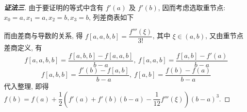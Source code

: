 \begin{proof}[{\songti \textbf{证法三}}]
    由于要证明的等式中含有 $f'(a)$ 及 $f'(b)$, 因而考虑选取重节点: $x_{0}=a,x_{1}=a,x_{2}=b,x_{3}=b$, 列差商表如下
    \begin{table}[H]
        \centering
    \end{table}
    而由差商与导数的关系, 得 $f[a,a,b,b]=\dfrac{f'''(\xi)}{3!}$, 其中 $\xi\in(a,b)$, 又由重节点差商定义, 有
    \begin{equation*}
        f[a,a,b,b]=\dfrac{f[a,b,b]-f[a,a,b]}{b-a},~f[a,a,b]=\dfrac{f[a,b]-f'(a)}{b-a}
    \end{equation*}
    \begin{equation*}
        f[a,b,b]=\dfrac{f'(b)-f[a,b]}{b-a},~f[a,b]=\dfrac{f(b)-f(a)}{b-a}
    \end{equation*}
    代入整理, 即得 $f(b)=f(a)+\dfrac{1}{2}(f'(a)+f'(b)(b-a)-\dfrac{1}{12}f'''(\xi))(b-a)^{3}.$
\end{proof}

